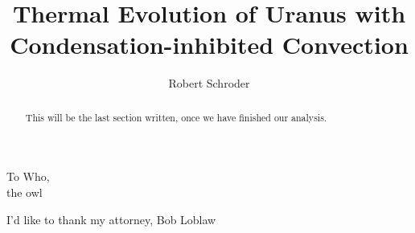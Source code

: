 \documentclass[11pt]{ucscthesisbs}
\begin{document}

\title{Thermal Evolution of Uranus with Condensation-inhibited Convection}
\author{Robert Schroder}
%
%





\maketitle
\copyrightpage

\begin{frontmatter}

\begin{abstract}
This will be the last section written, once we have finished our analysis.
\end{abstract}

\tableofcontents
%
%
\listoffigures
\listoftables

\begin{dedication}
\null\vfil
{\large
\begin{center}
To Who,\\\vspace{12pt}
the owl
\end{center}}
\vfil\null
\end{dedication}

\begin{acknowledgements}
I'd like to thank my attorney, Bob Loblaw
\end{acknowledgements}


\end{frontmatter}

\end{document}
